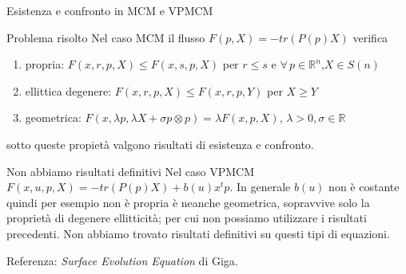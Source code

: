 
\begin{frame}{Esistenza e confronto in MCM e VPMCM}
  \begin{block}{Problema risolto}
    Nel caso MCM il flusso $F(p,X)=-tr(P(p)X)$ verifica
    \begin{enumerate}
    \item \alert{propria}: $F(x,r,p,X)\leq F(x,s,p,X)$ per $r\leq
      s$ e $\forall\,p\in\mathbb{R}^n$,$X\in S(n)$
    \item \alert{ellittica degenere}: $F(x,r,p,X)\leq
      F(x,r,p,Y)$ per $X\geq Y$
    \item \alert{geometrica}: $F(x,\lambda p,\lambda X+\sigma
      p\otimes p)=\lambda F(x,p,X)$, $\lambda >0,\sigma\in\mathbb{R}$
    \end{enumerate}
    sotto queste propietà valgono risultati di esistenza e confronto.
  \end{block}
  \begin{block}{Non abbiamo risultati definitivi}
    Nel caso VPMCM $F(x,u,p,X)=-tr(P(p)X)+b(u)x^tp$. In generale
    $b(u)$ non è costante quindi per esempio non è
    \alert{propria} è neanche \alert{geometrica}, sopravvive solo la
    proprietà di \alert{degenere ellitticità}; per cui  non possiamo
    utilizzare i risultati precedenti. Non abbiamo trovato risultati
    definitivi su questi tipi di equazioni.
  \end{block}
Referenza: \emph{Surface Evolution Equation} di Giga.
\end{frame}
